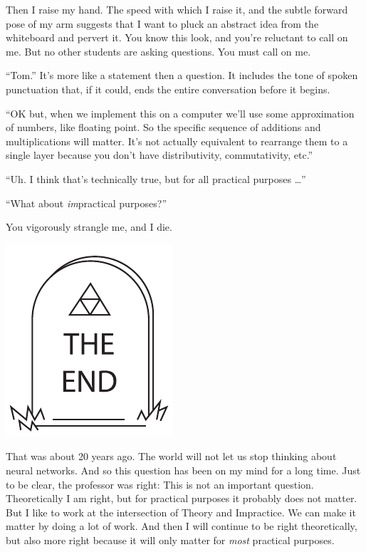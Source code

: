 \documentclass[twocolumn]{article}
\begin{document}
\smallskip
Then I raise my hand. The speed with which I raise it, and the subtle
forward pose of my arm suggests that I want to pluck an abstract idea
from the whiteboard and pervert it. You know this look, and you're
reluctant to call on me. But no other students are asking questions.
You must call on me.

\smallskip
``Tom.'' It's more like a statement then a question. It includes the
tone of spoken punctuation that, if it could, ends the entire
conversation before it begins.

\smallskip
``OK but, when we implement this on a computer we'll use some
approximation of numbers, like floating point. So the specific
sequence of additions and multiplications will matter. It's not
actually equivalent to rearrange them to a single layer because you
don't have distributivity, commutativity, etc.''

\smallskip
``Uh. I think that's technically true, but for all practical purposes \ldots''

\smallskip
``What about {\em im}practical purposes?''

\smallskip
You vigorously strangle me, and I die.

\begin{center}
\includegraphics[width=0.5 \linewidth]{the-end}
\end{center}

\medskip
That was about 20 years ago. The world will not let us stop thinking
about neural networks. And so this question has been on my mind for a
long time. Just to be clear, the professor was right: This is not an
important question. Theoretically I am right, but for practical
purposes it probably does not matter. But I like to work at the
intersection of Theory and Impractice. We can make it matter by doing
a lot of work. And then I will continue to be right theoretically, but
also more right because it will only matter for {\em most} practical
purposes.
\end{document}
